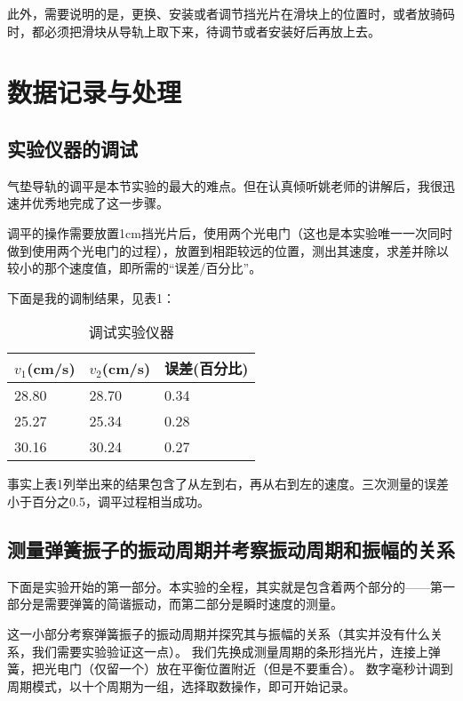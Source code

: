 \documentclass[11pt]{article}
\begin{document}
此外，需要说明的是，更换、安装或者调节挡光片在滑块上的位置时，或者放骑码时，都必须把滑块从导轨上取下来，待调节或者安装好后再放上去。

\section{数据记录与处理}

\subsection{实验仪器的调试}

气垫导轨的调平是本节实验的最大的难点。但在认真倾听姚老师的讲解后，我很迅速并优秀地完成了这一步骤。

调平的操作需要放置1cm挡光片后，使用两个光电门（这也是本实验唯一一次同时做到使用两个光电门的过程），放置到相距较远的位置，测出其速度，求差并除以较小的那个速度值，即所需的“误差/百分比”。

下面是我的调制结果，见表1：

\begin{table}[!ht]
    \centering
    \begin{tabular}{|l|l|l|}
    \hline
        $v_1$(cm/s) & $v_2$(cm/s) & 误差(百分比) \\ \hline
        28.80 & 28.70 & 0.34 \\ \hline
        25.27& 25.34 & 0.28 \\ \hline
        30.16 & 30.24 & 0.27 \\ \hline
    \end{tabular}
    \caption{调试实验仪器}
\end{table}

事实上表1列举出来的结果包含了从左到右，再从右到左的速度。三次测量的误差小于百分之0.5，调平过程相当成功。

\subsection{测量弹簧振子的振动周期并考察振动周期和振幅的关系}

下面是实验开始的第一部分。本实验的全程，其实就是包含着两个部分的——第一部分是需要弹簧的简谐振动，而第二部分是瞬时速度的测量。

这一小部分考察弹簧振子的振动周期并探究其与振幅的关系（其实并没有什么关系，我们需要实验验证这一点）。
我们先换成测量周期的条形挡光片，连接上弹簧，把光电门（仅留一个）放在平衡位置附近（但是不要重合）。
数字毫秒计调到周期模式，以十个周期为一组，选择取数操作，即可开始记录。
\end{document}
